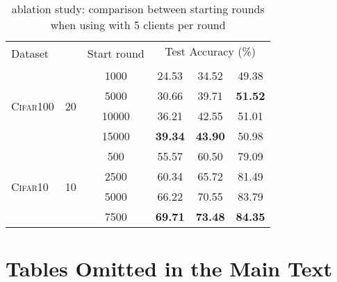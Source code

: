 \begin{table}[]\centering
\caption{\swa ablation study: comparison between \swa starting rounds when using \fedavg with 5 clients per round}\label{tab:abl_start}
\scriptsize
\setlength\tabcolsep{0.3cm}
    \begin{tabular}{lccccc}
    \toprule
    \multirow{2}{*}{Dataset} &\multirow{2}{*}{} & \multirow{2}{*}{Start round}  &   \multicolumn{3}{c}{Test Accuracy (\%)} \\
    \cmidrule(l){4-6} 
    & & &  &   &  \\
    \midrule
    \multirow{4}{*}{\textsc{Cifar100}} & \multirow{4}{*}{20} & 1000& 24.53&34.52&49.38\\
    & & 5000&30.66&39.71&\textbf{51.52}\\
    & & 10000&36.21&42.55&51.01\\
    & & 15000&\textbf{39.34}&\textbf{43.90}&50.98\\
    \midrule
    \multirow{4}{*}{\textsc{Cifar10}} & \multirow{4}{*}{10} & 500& 55.57&60.50&79.09\\
    & & 2500&60.34&65.72&81.49\\
    & & 5000&66.22&70.55&83.79\\
    & & 7500&\textbf{69.71}&\textbf{73.48}&\textbf{84.35}\\
    \bottomrule
    \end{tabular}
\end{table}

\section{Tables Omitted in the Main Text}

